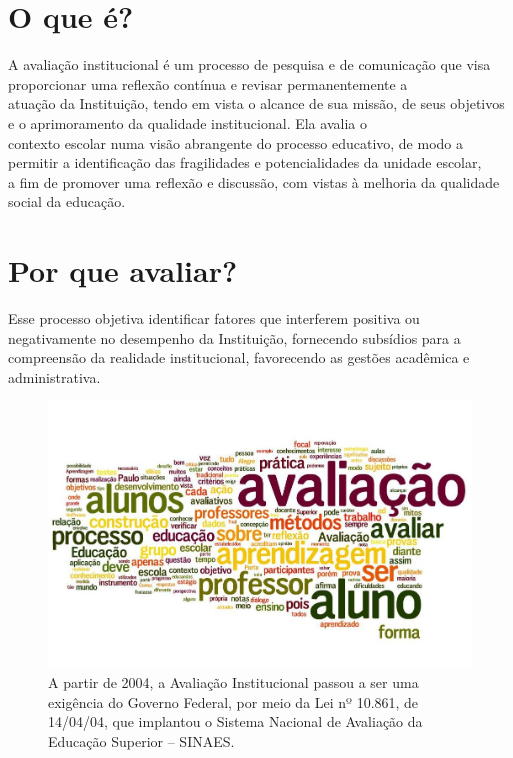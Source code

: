 \documentclass[final]{beamer}
\author{A. Beatriz \\ F.L. Pinheiro \\ M. Gabriel \\ T. Brunacci \\ V. Henrique}
\begin{document}
\begin{poster} 
\newcolumn

\section{O que é?}

A avaliação institucional é um processo de pesquisa e de comunicação que visa proporcionar uma reflexão contínua e revisar permanentemente a\\ atuação da Instituição, tendo em vista o alcance de sua missão, de seus objetivos e o aprimoramento da qualidade institucional.  Ela avalia o\\ contexto escolar numa visão abrangente do processo educativo, de modo a permitir a identificação das fragilidades e potencialidades da unidade escolar,\\ a fim de promover uma reflexão e discussão, com vistas à melhoria da qualidade social da educação.

\section{Por que avaliar?}
Esse processo objetiva identificar fatores que interferem positiva ou negativamente no desempenho da Instituição, fornecendo subsídios para a compreensão da realidade institucional, favorecendo as gestões acadêmica e administrativa.

\begin{figure}%
\centerline{\includegraphics[width=.8\columnwidth]{cloud}}
\caption{A partir de 2004, a Avaliação Institucional passou a ser uma exigência do Governo Federal, por meio da Lei nº 10.861, de 14/04/04, que implantou o Sistema Nacional de Avaliação da Educação Superior – SINAES.}%
\end{figure}


\end{poster}
\end{document}
